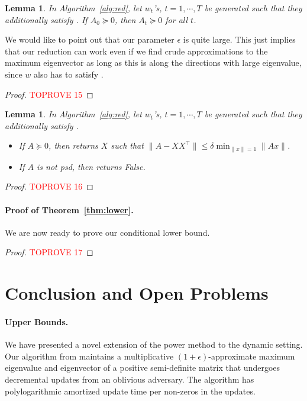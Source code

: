 \documentclass[11pt]{article}
\newtheorem{lemma}[theorem]{Lemma}
\newcommand\ww{\boldsymbol{\mathit{w}}}
\newcommand\xx{\boldsymbol{\mathit{x}}}
\renewcommand\AA{\boldsymbol{\mathit{A}}}
\newcommand\XX{\boldsymbol{\mathit{X}}}
\begin{document}
\begin{lemma}\label{lem:orthoUpdate}
In Algorithm~\ref{alg:red}, let $\ww_t$'s, $t=1,\cdots, T$ be generated such that they additionally satisfy . If $\AA_0\succeq 0$, then $\AA_t \succeq 0$ for all $t$.
\end{lemma}
 We would like to point out that our parameter $\epsilon$ is quite large. This just implies that our reduction can work even if we find crude approximations to the maximum eigenvector as long as this is along the directions with large eigenvalue, since $\ww$ also has to satisfy .
\begin{proof}\textcolor{red}{TOPROVE 15}\end{proof}


\begin{lemma}\label{lem:RedAns}
In Algorithm~\ref{alg:red}, let $\ww_t$'s, $t=1,\cdots, T$ be generated such that they additionally satisfy . 
\begin{itemize}
    \item If $\AA\succeq 0$, then  returns $\XX$ such that $\|\AA-\XX\XX^{\top}\|\leq \delta \min_{\|\xx\|=1}\|\AA\xx\|$. 
    \item If $\AA$ is not psd, then  returns {\sc False}.
\end{itemize}
\end{lemma}
\begin{proof}\textcolor{red}{TOPROVE 16}\end{proof}


\paragraph{Proof of Theorem~\ref{thm:lower}.} 
We are now ready to prove our conditional lower bound.
\begin{proof}\textcolor{red}{TOPROVE 17}\end{proof}








 	
	

\section{Conclusion and Open Problems}\label{sec:open}


\paragraph{Upper Bounds.}
We have presented a novel extension of the power method to the dynamic setting. Our algorithm from  maintains a multiplicative $(1+\epsilon)$-approximate maximum eigenvalue and eigenvector of a positive semi-definite matrix that undergoes decremental updates from an oblivious adversary. The algorithm has polylogarithmic amortized update time per non-zeros in the updates. 
\end{document}
